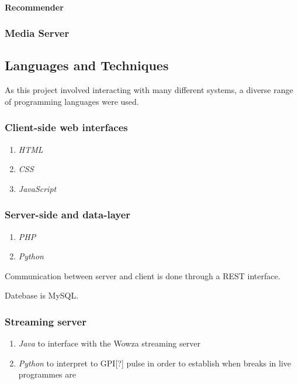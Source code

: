 \paragraph{Recommender}
\subsubsection{Media Server}



\subsection{Languages and Techniques}
As this project involved interacting with many different systems, a diverse range of programming languages were used.

\subsubsection{Client-side web interfaces}
\begin{enumerate}
\item \textit{HTML}
\item \textit{CSS}
\item \textit{JavaScript}
\end{enumerate}

\subsubsection{Server-side and data-layer}
\begin{enumerate}
\item \textit{PHP}
\item \textit{Python}
\end{enumerate}

Communication between server and client is done through a REST interface.

Datebase is MySQL.

\subsubsection{Streaming server}
\begin{enumerate}
\item \textit{Java} to interface with the Wowza streaming server
\item \textit{Python} to interpret to GPI[?] pulse in order to establish when breaks in live programmes are
\end{enumerate}

